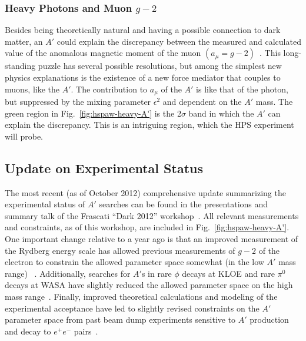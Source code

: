 \subsubsection{\texorpdfstring{Heavy Photons and Muon $g-2$}{Heavy Photons and Muon g-2}}

Besides being theoretically natural and having a possible connection to dark matter, an $A'$ could explain the discrepancy between the measured and 
calculated value of the anomalous magnetic moment of the muon $(a_\mu=g-2)$~\cite{Pospelov:2008zw}.  
This long-standing puzzle has several possible resolutions, but among the simplest new physics explanations
is the existence of a new force mediator that couples to muons, like the $A'$.  The contribution to $a_\mu$ of the $A'$ 
is like that of the photon, but suppressed by the mixing parameter $\epsilon^2$ and dependent on the $A'$ mass.  
The green region in Fig.~\ref{fig:hspaw-heavy-A'} is the 2$\sigma$ band in which the $A'$ can 
explain the discrepancy.  This is an intriguing region, which the HPS experiment will probe.  

\subsection{Update on Experimental Status}

The most recent (as of October 2012) comprehensive update summarizing the experimental status of $A'$ searches 
can be found in the presentations and summary talk of the Frascati ``Dark 2012'' workshop~\cite{Dark2012}.
All relevant measurements and constraints, as of this workshop, are included in Fig.~\ref{fig:hspaw-heavy-A'}.
One important change relative to a year ago is that an improved measurement of the Rydberg energy scale 
has allowed previous measurements of $g-2$ of the electron to constrain the allowed parameter space somewhat (in the low $A'$ mass range)
~\cite{endo:g2e,Davoudiasl:2012ig}.  
Additionally, searches for $A'$s in rare $\phi$ decays at KLOE and rare $\pi^0$ decays at WASA have slightly reduced 
the allowed parameter space on the high mass range~\cite{rarek}. 
Finally, improved theoretical calculations and modeling of the experimental acceptance have led to slightly revised constraints on the 
$A'$ parameter space from past beam dump experiments sensitive to $A'$ production and decay to $e^+e^-$ pairs~\cite{andreas}.

